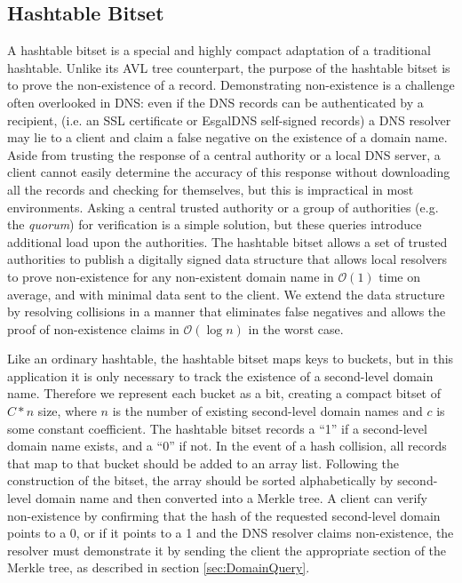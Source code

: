 \subsection{Hashtable Bitset}



A hashtable bitset is a special and highly compact adaptation of a traditional hashtable. Unlike its AVL tree counterpart, the purpose of the hashtable bitset is to prove the non-existence of a record. Demonstrating non-existence is a challenge often overlooked in DNS: even if the DNS records can be authenticated by a recipient, (i.e. an SSL certificate or EsgalDNS self-signed records) a DNS resolver may lie to a client and claim a false negative on the existence of a domain name. Aside from trusting the response of a central authority or a local DNS server, a client cannot easily determine the accuracy of this response without downloading all the records and checking for themselves, but this is impractical in most environments. Asking a central trusted authority or a group of authorities (e.g. the \emph{quorum}) for verification is a simple solution, but these queries introduce additional load upon the authorities. The hashtable bitset allows a set of trusted authorities to publish a digitally signed data structure that allows local resolvers to prove non-existence for any non-existent domain name in $ \mathcal{O}(1) $ time on average, and with minimal data sent to the client. We extend the data structure by resolving collisions in a manner that eliminates false negatives and allows the proof of non-existence claims in $ \mathcal{O}(\log{}n) $ in the worst case.

Like an ordinary hashtable, the hashtable bitset maps keys to buckets, but in this application it is only necessary to track the existence of a second-level domain name. Therefore we represent each bucket as a bit, creating a compact bitset of $ C * n $ size, where $ n $ is the number of existing second-level domain names and $ c $ is some constant coefficient. The hashtable bitset records a ``1'' if a second-level domain name exists, and a ``0'' if not. In the event of a hash collision, all records that map to that bucket should be added to an array list. Following the construction of the bitset, the array should be sorted alphabetically by second-level domain name and then converted into a Merkle tree. A client can verify non-existence by confirming that the hash of the requested second-level domain points to a 0, or if it points to a 1 and the DNS resolver claims non-existence, the resolver must demonstrate it by sending the client the appropriate section of the Merkle tree, as described in section \ref{sec:DomainQuery}.

